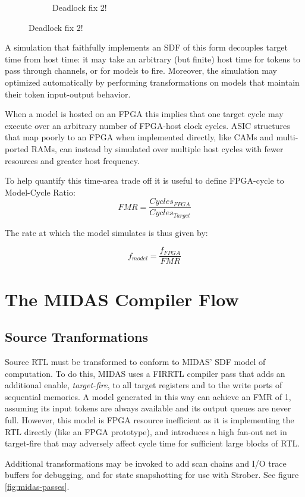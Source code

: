 \begin{figure}
\begin{subfigure}[t]{0.48\textwidth}
        \caption{Deadlock fix 2!}
        \label{fig:queue-decoupled-example}
    \end{subfigure}
\end{figure}


A simulation that faithfully implements an SDF of this form decouples
target time from host time: it may take an arbitrary (but finite) host time for
tokens to pass through channels, or for models to fire.  Moreover, the
simulation may optimized automatically by performing transformations on models
that maintain their token input-output behavior.

When a model is hosted on an FPGA this implies that one target cycle may
execute over an arbitrary number of FPGA-host clock cycles.  ASIC structures
that map poorly to an FPGA when implemented directly, like CAMs and
multi-ported RAMs, can instead by simulated over multiple host cycles with
fewer resources and greater host frequency.

To help quantify this time-area trade off it is useful to define FPGA-cycle to
Model-Cycle Ratio\cite{APorts}: $$ FMR = \frac{Cycles_{FPGA}}{Cycles_{Target}}
$$

\noindent The rate at which the model simulates is thus given by:

$$ f_{model} = \frac{f_{FPGA}}{FMR} $$

\section{The MIDAS Compiler Flow}

\subsection{Source Tranformations}\label{sec:source-transformations}

Source RTL must be transformed to conform to MIDAS' SDF model of computation.
To do this, MIDAS uses a FIRRTL compiler pass that adds an additional enable,
\emph{target-fire}, to all target registers and to the write ports of
sequential memories. A model generated in this way can achieve an FMR of 1,
assuming its input tokens are always available and its output queues are never
full.  However, this model is FPGA resource inefficient as it is implementing
the RTL directly (like an FPGA prototype), and introduces a high fan-out net in
target-fire that may adversely affect cycle time for sufficient large blocks of
RTL.

Additional transformations may be invoked to add scan chains and I/O trace
buffers for debugging, and for state snapshotting for use with
Strober\cite{strober}. See figure \ref{fig:midas-passes}.

